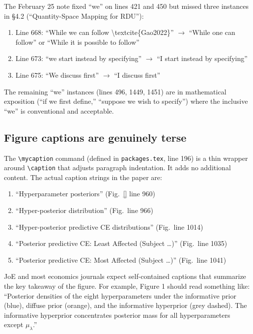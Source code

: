 \documentclass[12pt,a4paper]{article}
\begin{document}
The February 25 note fixed ``we'' on lines 421 and 450 but missed three
instances in \S4.2 (``Quantity-Space Mapping for RDU''):

\begin{enumerate}[label=(\alph*)]
  \item Line 668: ``While we can follow \textbackslash textcite\{Gao2022\}''
    $\to$ ``While one can follow'' or ``While it is possible to follow''
  \item Line 673: ``we start instead by specifying'' $\to$ ``I start instead
    by specifying''
  \item Line 675: ``We discuss first'' $\to$ ``I discuss first''
\end{enumerate}

The remaining ``we'' instances (lines 496, 1449, 1451) are in mathematical
exposition (``if we first define,'' ``suppose we wish to specify'') where the
inclusive ``we'' is conventional and acceptable.


\subsection{Figure captions are genuinely terse}
\label{sec:captions}

The \verb|\mycaption| command (defined in \texttt{packages.tex}, line 196) is a
thin wrapper around \verb|\caption| that adjusts paragraph indentation. It adds
no additional content. The actual caption strings in the paper are:

\begin{enumerate}[label=(\alph*)]
  \item ``Hyperparameter posteriors'' (Fig.\ \ref*{} line 960)
  \item ``Hyper-posterior distribution'' (Fig.\ line 966)
  \item ``Hyper-posterior predictive CE distributions'' (Fig.\ line 1014)
  \item ``Posterior predictive CE: Least Affected (Subject \ldots)'' (Fig.\ line 1035)
  \item ``Posterior predictive CE: Most Affected (Subject \ldots)'' (Fig.\ line 1041)
\end{enumerate}

JoE and most economics journals expect self-contained captions that summarize
the key takeaway of the figure. For example, Figure 1 should read something
like: ``Posterior densities of the eight hyperparameters under the informative
prior (blue), diffuse prior (orange), and the informative hyperprior (grey
dashed). The informative hyperprior concentrates posterior mass for all
hyperparameters except $\mu_\lambda$.''
\end{document}
